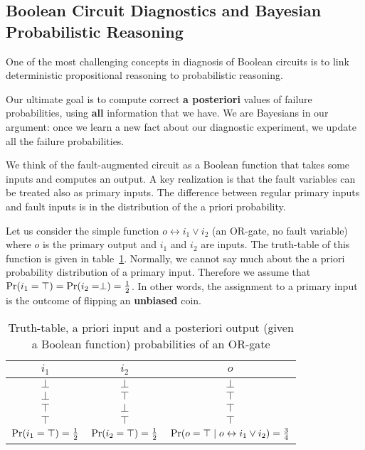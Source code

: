 \documentclass{article}
\begin{document}
\subsection{Boolean Circuit Diagnostics and Bayesian Probabilistic Reasoning}
%
One of the most challenging concepts in diagnosis of Boolean circuits
is to link deterministic propositional reasoning to probabilistic
reasoning.
\par
Our ultimate goal is to compute correct \textbf{a posteriori} values
of failure probabilities, using \textbf{all} information that we
have. We are Bayesians in our argument: once we learn a new fact about
our diagnostic experiment, we update all the failure probabilities.
\par
We think of the fault-augmented circuit as a Boolean function that
takes some inputs and computes an output. A key realization is that
the fault variables can be treated also as primary inputs. The
difference between regular primary inputs and fault inputs is in the
distribution of the a priori probability.
\par
Let us consider the simple function $o \leftrightarrow i_1 \vee i_2$
(an OR-gate, no fault variable) where $o$ is the primary output and
$i_1$ and $i_2$ are inputs. The truth-table of this function is given
in table~\ref{tbl:or}. Normally, we cannot say much about the a priori
probability distribution of a primary input. Therefore we assume that
$\mbox{Pr}(i_1 = \top) = \mbox{Pr}(i_2 = \perp) = \frac{1}{2}$. In other words, the
assignment to a primary input is the outcome of flipping an
\textbf{unbiased} coin.
\par
\begin{table}[hbt]
\begin{center}
\begin{tabular}{ccc}
  \toprule
  $i_1$   & $i_2$    & $o$     \\
  \midrule
  $\perp$ & $\perp$  & $\perp$ \\
  $\perp$ & $\top$   & $\top$  \\
  $\top$  & $\perp$  & $\top$  \\
  $\top$  & $\top$   & $\top$  \\
  \midrule
  $\mbox{Pr}(i_1 = \top) = \frac{1}{2}$ & $\mbox{Pr}(i_2 = \top) = \frac{1}{2}$ & $\mbox{Pr}(o = \top \;|\; o \leftrightarrow i_1 \vee i_2) = \frac{3}{4}$ \\
  \bottomrule
\end{tabular}
\end{center}
\caption{Truth-table, a priori input and a posteriori output (given a Boolean function) probabilities of an OR-gate\label{tbl:or}}
\end{table}
\end{document}
